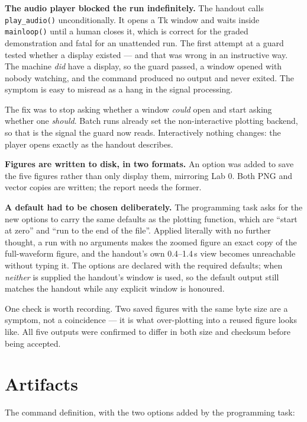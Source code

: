 \documentclass[11pt]{article}
\begin{document}
\textbf{The audio player blocked the run indefinitely.} The handout calls
\texttt{play\_audio()} unconditionally. It opens a Tk window and waits inside
\texttt{mainloop()} until a human closes it, which is correct for the graded
demonstration and fatal for an unattended run. The first attempt at a guard
tested whether a display existed --- and that was wrong in an instructive way.
The machine \emph{did} have a display, so the guard passed, a window opened
with nobody watching, and the command produced no output and never exited. The
symptom is easy to misread as a hang in the signal processing.

The fix was to stop asking whether a window \emph{could} open and start asking
whether one \emph{should}. Batch runs already set the non-interactive plotting
backend, so that is the signal the guard now reads. Interactively nothing
changes: the player opens exactly as the handout describes.

\textbf{Figures are written to disk, in two formats.} An option was added to
save the five figures rather than only display them, mirroring Lab 0. Both PNG
and vector copies are written; the report needs the former.

\textbf{A default had to be chosen deliberately.} The programming task asks for
the new options to carry the same defaults as the plotting function, which are
``start at zero'' and ``run to the end of the file''. Applied literally with no
further thought, a run with no arguments makes the zoomed figure an exact copy
of the full-waveform figure, and the handout's own 0.4--1.4\,s view becomes
unreachable without typing it. The options are declared with the required
defaults; when \emph{neither} is supplied the handout's window is used, so the
default output still matches the handout while any explicit window is honoured.

One check is worth recording. Two saved figures with the same byte size are a
symptom, not a coincidence --- it is what over-plotting into a reused figure
looks like. All five outputs were confirmed to differ in both size and
checksum before being accepted.

\section{Artifacts}

The command definition, with the two options added by the programming task:
\end{document}
